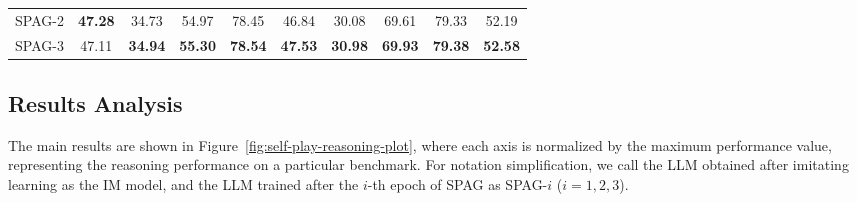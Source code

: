 \documentclass{article}
\theoremstyle{plain}
\theoremstyle{definition}
\theoremstyle{remark}
\begin{document}
\begin{table}[t]
{\begin{tabular}{l|c|ccccccc|c}
        SPAG-2 & \textbf{47.28}  & 34.73  & 54.97  & 78.45  & 46.84  & 30.08  & 69.61  & 79.33  & 52.19  \\ 
        SPAG-3 & 47.11  & \textbf{34.94}  & \textbf{55.30}  & \textbf{78.54}  & \textbf{47.53}  & \textbf{30.98}  & \textbf{69.93}  & \textbf{79.38}  & \textbf{52.58} \\ 
        \bottomrule
    \end{tabular}    
    }
    \vspace{-4mm}
\end{table}



\vspace{-2mm}
\subsection{Results Analysis} \label{sec:exp-results-analysis}
\vspace{-2mm}
The main results are shown in Figure~\ref{fig:self-play-reasoning-plot}, where each axis is normalized by the maximum performance value, representing the reasoning performance on a particular benchmark. For notation simplification, we call the LLM obtained after imitating learning as the IM model, and the LLM trained after the $i$-th epoch of SPAG as SPAG-$i$ ($i=1,2,3$).
\end{document}
